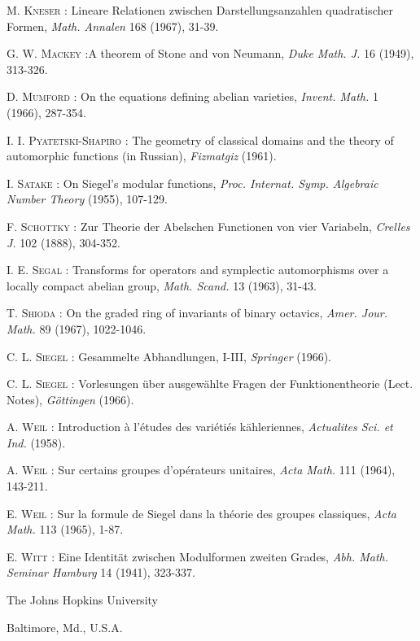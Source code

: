 \begin{thebibliography}{99}
 \textsc{M. Kneser :} Lineare Relationen zwischen Darstellungsanzahlen quadratischer Formen, {\em Math. Annalen} 168 (1967), 31-39.

 \textsc{G. W. Mackey :}\pageoriginale A theorem of Stone and von Neumann, {\em Duke Math. J.} 16 (1949), 313-326.

 \textsc{D. Mumford :} On the equations defining abelian varieties, {\em Invent. Math.} 1 (1966), 287-354.

 \textsc{I. I. Pyatetski-Shapiro :} The geometry of classical domains and the theory of automorphic functions (in Russian), {\em Fizmatgiz} (1961).

 \textsc{I. Satake :} On Siegel's modular functions, {\em Proc. Internat. Symp. Algebraic Number Theory} (1955), 107-129.

 \textsc{F. Schottky :} Zur Theorie der Abelschen Functionen von vier Variabeln, {\em Crelles J.} 102 (1888), 304-352.

 \textsc{I. E. Segal :} Transforms for operators and symplectic automorphisms over a locally compact abelian group, {\em Math. Scand.} 13 (1963), 31-43.

 \textsc{T. Shioda :} On the graded ring of invariants of binary octavics, {\em Amer. Jour. Math.} 89 (1967), 1022-1046.

 \textsc{C. L. Siegel :} Gesammelte Abhandlungen, I-III, {\em Springer} (1966).

 \textsc{C. L. Siegel :} Vorlesungen \"uber ausgew\"ahlte Fragen der Funktionentheorie (Lect. Notes), {\em G\"ottingen} (1966).

 \textsc{A. Weil :} Introduction \`a l'\'etudes des vari\'eti\'es k\"ahleriennes, {\em Actualites Sci. et Ind.} (1958).

 \textsc{A. Weil :} Sur certains groupes d'op\'erateurs unitaires, {\em Acta Math.} 111 (1964), 143-211.

 \textsc{E. Weil :} Sur la formule de Siegel dans la th\'eorie des groupes classiques, {\em Acta Math.} 113 (1965), 1-87.

 \textsc{E. Witt :} Eine Identit\"at zwischen Modulformen zweiten Grades, {\em Abh. Math. Seminar Hamburg} 14 (1941), 323-337.
\end{thebibliography}

\bigskip
\noindent
{\small The Johns Hopkins University}

\noindent
{\small Baltimore, Md., U.S.A.}

